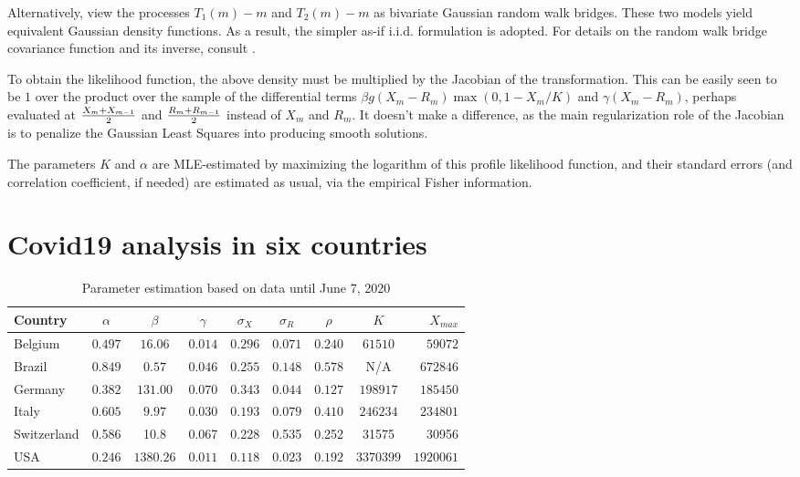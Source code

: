 \documentclass{article}
\begin{document}
{Alternatively, view the processes $T_1(m)-m$ and $T_2(m)-m$ as bivariate Gaussian random walk bridges.
These two models yield equivalent Gaussian density functions. As a result, the simpler as-if i.i.d. formulation is adopted. For details on the random walk bridge covariance function and its inverse, consult \cite{Cuadras}.

To obtain the likelihood function, the above density must be multiplied by the Jacobian of the transformation. This can be easily seen to be $1$ over the product over the sample of the differential terms $\beta g(X_m-R_m)\max(0,1-X_m/K)$ and $\gamma (X_m-R_m)$, perhaps evaluated at
${{X_m+X_{m-1}} \over 2}$ and ${{R_m+R_{m-1}} \over 2}$ instead of $X_m$ and $R_m$. It doesn't make a difference, as the main regularization role of the Jacobian is to penalize the Gaussian Least Squares into producing smooth solutions.

\bigskip

The parameters $K$ and $\alpha$ are MLE-estimated by maximizing the logarithm of this profile likelihood function, and their standard errors (and correlation coefficient, if needed) are estimated as usual, via the empirical Fisher information.


\section{Covid19 analysis in six countries} \label{Covid19}

\begin{table}
\begin{center}
\begin{tabular}{l|ccccccc|r}
Country & $\alpha$ & $\beta$ & $\gamma$ & $\sigma_X $ & $ \sigma_R$ & $\rho$ & $K$ & $X_{max}$ \\ \hline
Belgium & $0.497$ & $16.06$ & $0.014$ & $0.296$ & $0.071$ & $0.240$ & $61510$ & $59072$ \\
Brazil  & $0.849$ & $0.57$ & $0.046$ & $0.255$ & $0.148$ & $0.578$ & N/A & $672846$ \\
Germany & $0.382$ & $131.00$ & $0.070$ & $0.343$ & $0.044$ & $0.127$ & $198917$ & $185450$ \\
Italy  & $0.605$ & $9.97$ & $0.030$ & $0.193$ & $0.079$ & $0.410$ & $246234$ & $234801$ \\
Switzerland & 0.586	 &	10.8 & 0.067 & 0.228  & 0.535 & 0.252 & 31575&      30956	    \\
USA    & $0.246$  & $1380.26$ & $0.011$ & $0.118$ & $0.023$ & $0.192$ & $3370399$ & $1920061$ \\ \hline
\end{tabular}
\caption{
Parameter estimation based on data until June 7, 2020
\label{tablejune7}
}
\end{center}
\end{table}

}
\end{document}
